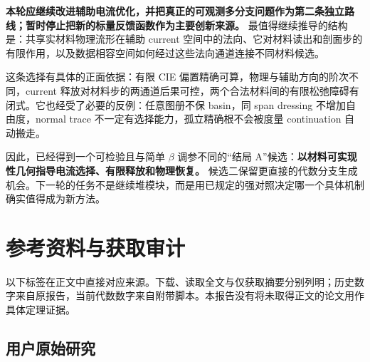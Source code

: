 \documentclass[10pt,a4paper]{article}
\begin{document}
\textbf{本轮应继续改进辅助电流优化，并把真正的可观测多分支问题作为第二条独立路线；暂时停止把新的标量反馈函数作为主要创新来源。}
最值得继续推导的结构是：共享实材料物理流形在辅助 current
空间中的法向、它对材料读出和剖面步的有限作用，以及数据相容空间如何经过这些法向通道连接不同材料候选。

这条选择有具体的正面依据：有限 CIE
偏置精确可算，物理与辅助方向的阶次不同，current
释放对材料步的两通道后果可控，两个合法材料间的有限松弛障碍有闭式。它也经受了必要的反例：任意图册不保
basin，同 span dressing 不增加自由度，normal trace
不一定有选择能力，孤立精确根不会被度量 continuation 自动搬走。

因此，已经得到一个可检验且与简单 \(\beta\) 调参不同的``结局
A''候选：\textbf{以材料可实现性几何指导电流选择、有限释放和物理恢复。}
候选二保留更直接的代数分支生成机会。下一轮的任务不是继续堆模块，而是用已规定的强对照决定哪一个具体机制确实值得成为新方法。

\hypertarget{ux53c2ux8003ux8d44ux6599ux4e0eux83b7ux53d6ux5ba1ux8ba1}{%
\section{参考资料与获取审计}\label{ux53c2ux8003ux8d44ux6599ux4e0eux83b7ux53d6ux5ba1ux8ba1}}

以下标签在正文中直接对应来源。下载、读取全文与仅获取摘要分别列明；历史数字来自原报告，当前代数数字来自附带脚本。本报告没有将未取得正文的论文用作具体定理证据。

\hypertarget{ux7528ux6237ux539fux59cbux7814ux7a76}{%
\subsection{用户原始研究}\label{ux7528ux6237ux539fux59cbux7814ux7a76}}
\end{document}
